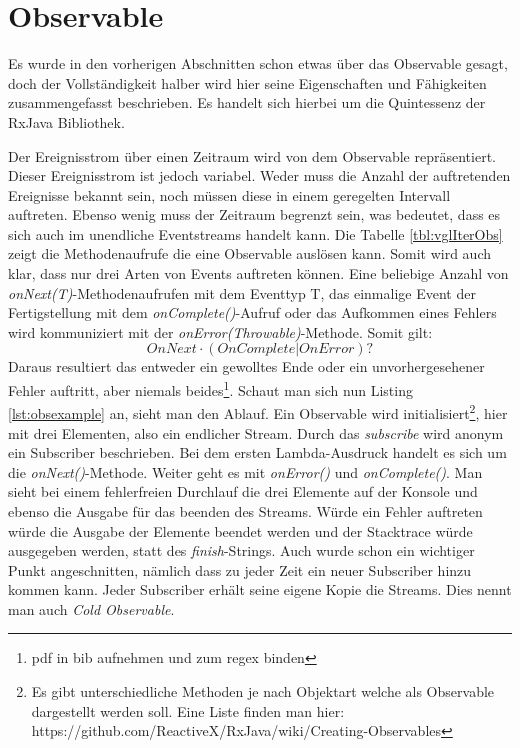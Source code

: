 \section{Observable}
Es wurde in den vorherigen Abschnitten schon etwas über das Observable gesagt, doch der Vollständigkeit halber wird hier seine Eigenschaften und Fähigkeiten zusammengefasst beschrieben. Es handelt sich hierbei um die Quintessenz der RxJava Bibliothek.

Der Ereignisstrom über einen Zeitraum wird von dem Observable repräsentiert. Dieser Ereignisstrom ist jedoch variabel. Weder muss die Anzahl der auftretenden Ereignisse bekannt sein, noch müssen diese in einem geregelten Intervall auftreten. Ebenso wenig muss der Zeitraum begrenzt sein, was bedeutet, dass es sich auch im unendliche Eventstreams handelt kann. Die Tabelle \ref{tbl:vglIterObs} zeigt die Methodenaufrufe die eine Observable auslösen kann. Somit wird auch klar, dass nur drei Arten von Events auftreten können. Eine beliebige Anzahl von \textit{onNext(T)}-Methodenaufrufen mit dem Eventtyp T, das einmalige Event der Fertigstellung mit dem \textit{onComplete()}-Aufruf oder das Aufkommen eines Fehlers wird kommuniziert mit der \textit{onError(Throwable)}-Methode. Somit gilt: 
\begin{displaymath}
	OnNext\cdot(OnComplete | OnError)?
\end{displaymath}
Daraus resultiert das entweder ein gewolltes Ende oder ein unvorhergesehener Fehler auftritt, aber niemals beides\footnote{pdf in bib aufnehmen und zum regex binden}. Schaut man sich nun Listing \ref{lst:obsexample} an, sieht man den Ablauf. Ein Observable wird initialisiert\footnote{Es gibt unterschiedliche Methoden je nach Objektart welche als Observable dargestellt werden soll. Eine Liste finden man hier: https://github.com/ReactiveX/RxJava/wiki/Creating-Observables}, hier mit drei Elementen, also ein endlicher Stream. Durch das \textit{subscribe} wird anonym ein Subscriber beschrieben. Bei dem ersten Lambda-Ausdruck handelt es sich um die \textit{onNext()}-Methode. Weiter geht es mit \textit{onError()} und \textit{onComplete()}. Man sieht bei einem fehlerfreien Durchlauf die drei Elemente auf der Konsole und ebenso die Ausgabe für das beenden des Streams. Würde ein Fehler auftreten würde die Ausgabe der Elemente beendet werden und der Stacktrace würde ausgegeben werden, statt des \textit{finish}-Strings. Auch wurde schon ein wichtiger Punkt angeschnitten, nämlich dass zu jeder Zeit ein neuer Subscriber hinzu kommen kann. Jeder Subscriber erhält seine eigene Kopie die Streams. Dies nennt man auch \textit{Cold Observable}.
